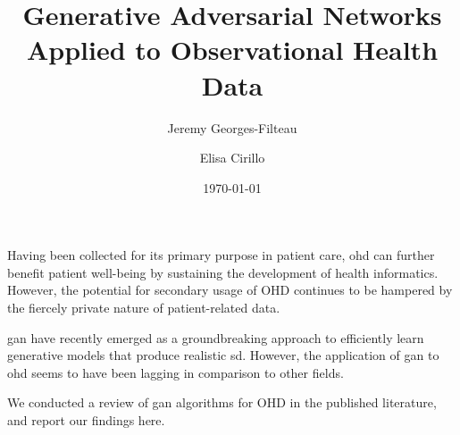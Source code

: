 \documentclass[10pt]{article}
\renewenvironment{abstract}
 {{\bfseries\noindent{\abstractname}\par\nobreak}\footnotesize}
 {\bigskip}
\begin{document}
\title{Generative Adversarial Networks Applied to Observational Health Data}

\author[1,2]{Jeremy Georges-Filteau}%
\author[2]{Elisa Cirillo}%
%
%


\vspace{-1em}

 \date{\today}

\begingroup
\let\center\flushleft
\let\endcenter\endflushleft
\maketitle
\endgroup



\begin{abstract}
Having been collected for its primary purpose in patient care,
\gls{ohd} can further benefit patient well-being
by sustaining the development of health informatics.~ However, the
potential for secondary usage of OHD continues to be hampered by the
fiercely private nature of patient-related data. ~

\gls{gan} have recently emerged as a groundbreaking approach to
efficiently learn generative models that produce realistic \gls{sd}. However, the application of \gls{gan} to \gls{ohd} seems to have been
lagging in comparison to other fields.

We conducted a review of \gls{gan} algorithms for OHD in the published
literature, and report our findings here.%



\end{abstract}%












\clearpage

\printglossary[type=\acronymtype]

\printglossary
\end{document}
